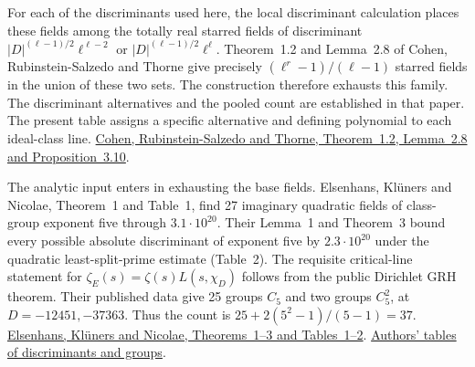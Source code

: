 For each of the discriminants used here, the local discriminant
calculation places these fields among the totally real starred fields
of discriminant $|D|^{(\ell-1)/2}\ell^{\ell-2}$ or
$|D|^{(\ell-1)/2}\ell^\ell$.
Theorem~1.2 and Lemma~2.8 of Cohen, Rubinstein-Salzedo and Thorne
give precisely $(\ell^r-1)/(\ell-1)$ starred fields in the union
of these two sets. The construction therefore exhausts this family.
The discriminant alternatives and the pooled count are established
in that paper. The present table assigns a specific alternative and
defining polynomial to each ideal-class line.
\href{https://arxiv.org/pdf/1405.1075v2}{Cohen, Rubinstein-Salzedo
and Thorne, Theorem~1.2, Lemma~2.8 and Proposition~3.10}.

The analytic input enters in exhausting the base fields.
Elsenhans, Kl\"uners and Nicolae, Theorem~1 and Table~1, find 27
imaginary quadratic fields of class-group exponent five through
$3.1\cdot 10^{20}$. Their Lemma~1 and Theorem~3 bound every possible
absolute discriminant of exponent five by $2.3\cdot 10^{20}$ under the
quadratic least-split-prime estimate (Table~2). The requisite critical-line
statement for $\zeta_E(s)=\zeta(s)L(s,\chi_D)$ follows from the public
Dirichlet GRH theorem. Their published data give 25 groups $C_5$ and
two groups $C_5^2$, at $D=-12451,-37363$. Thus the count is
$25+2(5^2-1)/(5-1)=37$.
\href{https://arxiv.org/pdf/1803.02056}{Elsenhans, Kl\"uners and
Nicolae, Theorems~1--3 and Tables~1--2}.
\href{https://math.uni-paderborn.de/en/ag/ca/research/exponent/exponent0}
{Authors' tables of discriminants and groups}.
